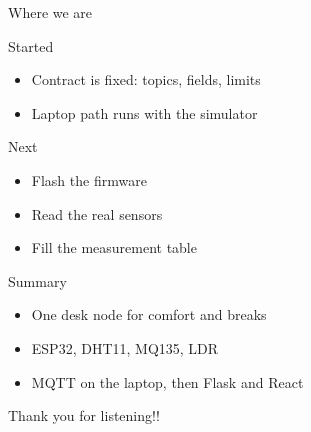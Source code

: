 \documentclass[pdf]{beamer}
\begin{document}
\begin{frame}{Where we are}
    \begin{block}{Started}
        \begin{itemize}
            \item Contract is fixed: topics, fields, limits
            \item Laptop path runs with the simulator
        \end{itemize}
    \end{block}
    \begin{block}{Next}
        \begin{itemize}
            \item Flash the firmware
            \item Read the real sensors
            \item Fill the measurement table
        \end{itemize}
    \end{block}
\end{frame}

\begin{frame}{Summary}
    \begin{itemize}
        \item One desk node for comfort and breaks
        \item ESP32, DHT11, MQ135, LDR
        \item MQTT on the laptop, then Flask and React
    \end{itemize}
\end{frame}

\begin{frame}
    \centering
    \vspace{1cm}
    \huge{Thank you for listening!!}
\end{frame}
\end{document}
